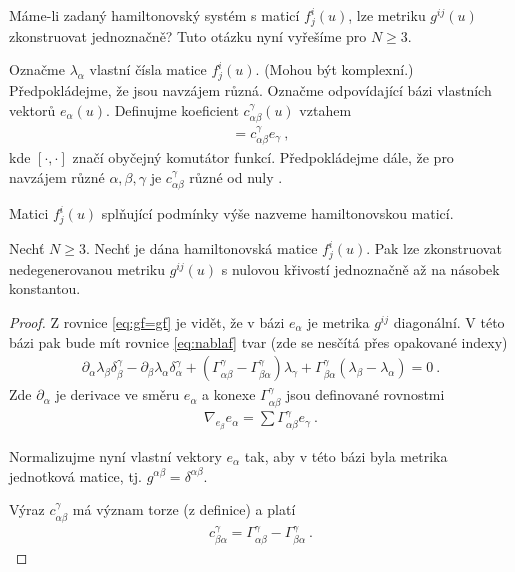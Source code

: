Máme-li zadaný hamiltonovský systém s maticí $f^i_j(u)$, lze metriku $g^{ij}(u)$ zkonstruovat jednoznačně? Tuto otázku nyní vyřešíme pro $N \geq 3$. 

Označme $\lambda_\alpha$ vlastní čísla matice $f^i_j(u)$. (Mohou být komplexní.) Předpokládejme, že jsou navzájem různá. Označme odpovídající bázi vlastních vektorů $e_\alpha(u)$. Definujme koeficient $c^\gamma_{\alpha \beta}(u)$ vztahem
\begin{align}
    [e_\alpha,e_\beta] = c^\gamma_{\alpha \beta} e_\gamma \:,
\end{align}
kde $[\cdot,\cdot]$ značí obyčejný komutátor funkcí. Předpokládejme dále, že pro navzájem různé $\alpha, \beta, \gamma$ je $c^\gamma_{\alpha \beta}$ různé od nuly .

\begin{definition}
    Matici $f^i_j(u)$ splňující podmínky výše nazveme hamiltonovskou maticí.
\end{definition}

\begin{theorem}
    Nechť $N \geq 3$. Nechť je dána hamiltonovská matice $f^i_j(u)$. Pak lze zkonstruovat nedegenerovanou metriku $g^{ij}(u)$ s nulovou křivostí jednoznačně až na násobek konstantou.
\end{theorem}

\begin{proof}
    Z rovnice \eqref{eq:gf=gf} je vidět, že v bázi $e_\alpha$ je metrika $g^{ij}$ diagonální. 
    V této bázi pak bude mít rovnice \eqref{eq:nablaf} tvar (zde se nesčítá přes opakované indexy)
    \begin{align}
        \partial_\alpha \lambda_\beta \delta_\beta^\gamma - \partial_\beta \lambda_\alpha \delta_\alpha^\gamma + (\Gamma_{\alpha \beta}^\gamma - \Gamma_{\beta \alpha}^\gamma ) \lambda_\gamma + \Gamma_{\beta \alpha}^\gamma (\lambda_\beta - \lambda_\alpha) = 0 \:.
    \end{align}
    Zde $\partial_\alpha$ je derivace ve směru $e_\alpha$ a konexe $\Gamma_{\alpha \beta}^\gamma$ jsou definované rovnostmi
    \begin{align}
        \nabla_{e_\beta} e_\alpha = \sum \Gamma^\gamma_{\alpha \beta} e_\gamma \:.
    \end{align}

    Normalizujme nyní vlastní vektory $e_\alpha$ tak, aby v této bázi byla metrika jednotková matice, tj. $g^{\alpha \beta} = \delta^{\alpha \beta}$.

    Výraz $c^\gamma_{\alpha \beta}$ má význam torze (z definice) a platí
    \begin{align}
        c^\gamma_{\beta \alpha} = \Gamma^\gamma_{\alpha \beta} - \Gamma^\gamma_{\beta \alpha} \:.
    \end{align} 

\end{proof}


